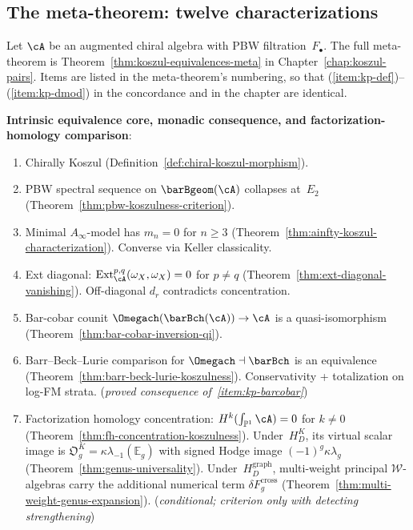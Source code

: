 \subsection{The meta-theorem: twelve characterizations}
\label{subsec:concordance-koszulness-meta-theorem}

Let $\cA$ be an augmented chiral algebra with PBW
filtration~$F_\bullet$. The full meta-theorem is
Theorem~\ref{thm:koszul-equivalences-meta} in
Chapter~\ref{chap:koszul-pairs}.
Items are listed in the meta-theorem's numbering, so that
\textup{(\ref{item:kp-def})}--\textup{(\ref{item:kp-dmod})}
in the concordance and in the chapter are identical.

\medskip\noindent
\textbf{Intrinsic equivalence core, monadic consequence, and
factorization-homology comparison}:

\begin{enumerate}[label=\textup{(\roman*)},ref=\roman*]
\item\label{item:kp-def}
 Chirally Koszul (Definition~\ref{def:chiral-koszul-morphism}).
 \hfill \checkmark
\item\label{item:kp-pbw}
 PBW spectral sequence on $\barBgeom(\cA)$ collapses at~$E_2$
 (Theorem~\ref{thm:pbw-koszulness-criterion}).
 \hfill \checkmark
\item\label{item:kp-ainfty}
 Minimal $A_\infty$-model has $m_n = 0$ for $n \ge 3$
 (Theorem~\ref{thm:ainfty-koszul-characterization}).
 Converse via Keller classicality.
 \hfill \checkmark
\item\label{item:kp-ext}
 Ext diagonal: $\operatorname{Ext}^{p,q}_\cA(\omega_X,\omega_X)=0$ for $p \neq q$
 (Theorem~\ref{thm:ext-diagonal-vanishing}).
 Off-diagonal $d_r$ contradicts concentration.
 \hfill \checkmark
\item\label{item:kp-barcobar}
 Bar-cobar counit $\Omegach(\barBch(\cA)) \to \cA$ is a quasi-isomorphism
 (Theorem~\ref{thm:bar-cobar-inversion-qi}).
 \hfill \checkmark
\item\label{item:kp-barrbeck}
 Barr--Beck--Lurie comparison for $\Omegach \dashv \barBch$ is an equivalence
 (Theorem~\ref{thm:barr-beck-lurie-koszulness}).
 Conservativity + totalization on log-FM strata.
 \hfill (\emph{proved consequence of~\ref{item:kp-barcobar}})
\item\label{item:kp-facthom}
 Factorization homology concentration:
 $H^k(\int_{\mathbb{P}^1} \cA)=0$ for $k \neq 0$
 \textup{(}Theorem~\ref{thm:fh-concentration-koszulness}\textup{)}.
 Under~$H_D^K$, its virtual scalar image is
 $\mathfrak O_g^K=\kappa\lambda_{-1}(\mathbb E_g)$ with signed Hodge
 image $(-1)^g\kappa\lambda_g$
 \textup{(}Theorem~\ref{thm:genus-universality}\textup{)}.
 Under~$H_D^{\mathrm{graph}}$, multi-weight principal
 $\mathcal W$-algebras carry the additional numerical term
 $\delta F_g^{\mathrm{cross}}$
 \textup{(}Theorem~\ref{thm:multi-weight-genus-expansion}\textup{)}.
 \hfill (\emph{conditional; criterion only with detecting strengthening})
\end{enumerate}

